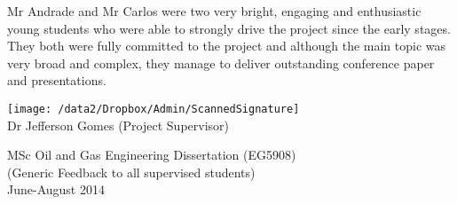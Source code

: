 \documentclass[14pt,twoside]{report}
\begin{document}
Mr Andrade and Mr Carlos were two very bright, engaging and enthusiastic young students who were able to strongly drive the project since the early stages. They both were fully committed to the project and although the main topic was very broad and complex, they manage to deliver outstanding conference paper and presentations.
 
\begin{center}
\texttt{[image: /data2/Dropbox/Admin/ScannedSignature]}\\
\vspace{-.5cm}
{Dr Jefferson Gomes (Project Supervisor)}\\
\end{center}



\clearpage



\begin{center}
\Huge{MSc Oil and Gas Engineering Dissertation (EG5908)}\\
\huge{(Generic Feedback to all supervised students)}\\
\huge{June-August 2014}
\end{center}

\vfill

\clearpage

\end{document}

